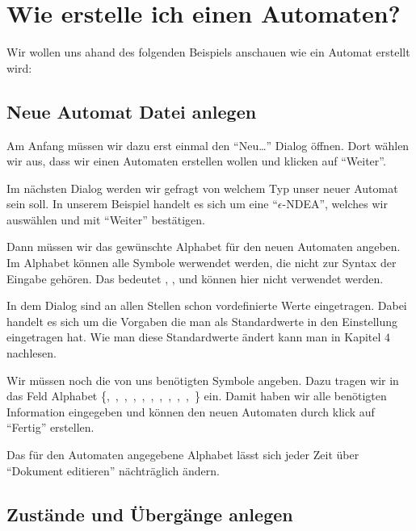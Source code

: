 \chapter{Wie erstelle ich einen Automaten?}

Wir wollen uns ahand des folgenden Beispiels anschauen wie ein Automat erstellt
wird:\vspace{10pt}

\section{Neue Automat Datei anlegen}

Am Anfang müssen wir dazu erst einmal den "`Neu\ldots"' Dialog öffnen. Dort
wählen wir aus, dass wir einen Automaten erstellen wollen und klicken
auf "`Weiter"'.\vspace{10pt}

Im nächsten Dialog werden wir gefragt von welchem Typ unser neuer
Automat sein soll. In unserem Beispiel handelt es sich um eine
"`$\epsilon$-NDEA"', welches wir auswählen und mit "`Weiter"'
bestätigen.\vspace{10pt}

Dann müssen wir das gewünschte Alphabet für den neuen Automaten
angeben. Im Alphabet können alle Symbole werwendet werden, die nicht zur Syntax
der Eingabe gehören. Das bedeutet \Symbol{,}, \Symbol{\{}, \Symbol{\}} und
\SymbolEmpty{} können hier nicht verwendet werden.\vspace{10pt}

In dem Dialog sind an allen Stellen schon vordefinierte Werte eingetragen.
Dabei handelt es sich um die Vorgaben die man als Standardwerte in den
Einstellung eingetragen hat. Wie man diese Standardwerte ändert kann man in Kapitel $4$ nachlesen.\vspace{10pt}

Wir müssen noch die von uns benötigten Symbole angeben. Dazu tragen wir in das
Feld Alphabet \{,\ ,\ ,\ ,\
,\ ,\ ,\ ,\ ,\ ,\
\Symbol{-}\} ein. Damit haben wir alle benötigten Information eingegeben und
können den neuen Automaten durch klick auf "`Fertig"' erstellen.\vspace{10pt}
\vspace{10pt} 

Das für den Automaten angegebene Alphabet lässt sich jeder Zeit über "`Dokument
editieren"' nächträglich ändern.

\section{Zustände und Übergänge anlegen}

